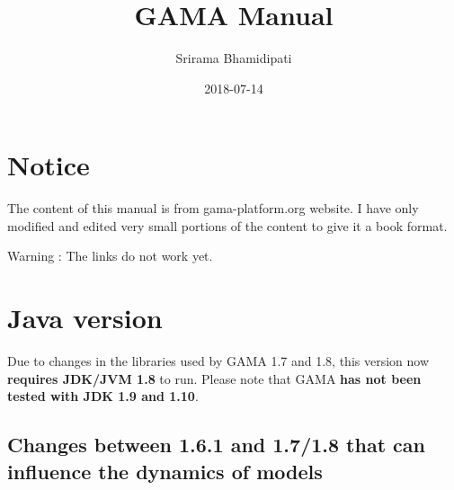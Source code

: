 \documentclass[]{book}
\title{GAMA Manual}
\author{Srirama Bhamidipati}
\date{2018-07-14}
\theoremstyle{definition}
\theoremstyle{definition}
\theoremstyle{definition}
\theoremstyle{remark}
\begin{document}
\maketitle

{
\setcounter{tocdepth}{1}
\tableofcontents
}
\chapter*{Notice}\label{notice}

The content of this manual is from gama-platform.org website. I have
only modified and edited very small portions of the content to give it a
book format.

Warning : The links do not work yet.

\chapter{Java version}\label{java-version}

Due to changes in the libraries used by GAMA 1.7 and 1.8, this version
now \textbf{requires JDK/JVM 1.8} to run. Please note that GAMA
\textbf{has not been tested with JDK 1.9 and 1.10}.

\section{Changes between 1.6.1 and 1.7/1.8 that can influence the
dynamics of
models}\label{changes-between-1.6.1-and-1.71.8-that-can-influence-the-dynamics-of-models}
\end{document}
